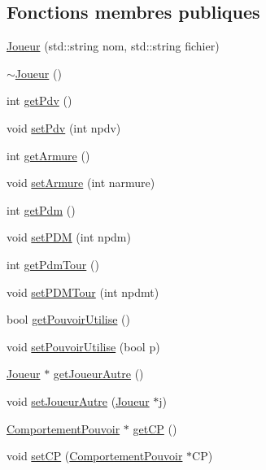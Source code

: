 \subsection*{Fonctions membres publiques}
\begin{DoxyCompactItemize}
\item 
\hyperlink{class_joueur_a055a0bc38f47a424243d44e7078af129}{Joueur} (std\-::string nom, std\-::string fichier)
\item 
\hyperlink{class_joueur_a9fb594f755601ee77ce5884c4c0861f3}{$\sim$\-Joueur} ()
\item 
int \hyperlink{class_joueur_a3deefa81ebbb921d6cef52322777dee7}{get\-Pdv} ()
\item 
void \hyperlink{class_joueur_a8f850d90156ccfb2f7599cc6658dc384}{set\-Pdv} (int npdv)
\item 
int \hyperlink{class_joueur_adab9394b18e1e65a77aa8dad7b51ec28}{get\-Armure} ()
\item 
void \hyperlink{class_joueur_a478be77fdcec7845f75fcb390b764027}{set\-Armure} (int narmure)
\item 
int \hyperlink{class_joueur_ac950c36b21e1dfc7038d9bb4e1f53361}{get\-Pdm} ()
\item 
void \hyperlink{class_joueur_a199d04e5240f4078ba2f3da2431f0bb2}{set\-P\-D\-M} (int npdm)
\item 
int \hyperlink{class_joueur_ab9297495de7521ac2198c7ce8d38191c}{get\-Pdm\-Tour} ()
\item 
void \hyperlink{class_joueur_a3984848768db7e175aeeb51ca89e4eb3}{set\-P\-D\-M\-Tour} (int npdmt)
\item 
bool \hyperlink{class_joueur_a0344bd2b30346f73e23239b62647e26d}{get\-Pouvoir\-Utilise} ()
\item 
void \hyperlink{class_joueur_a57f6f8d3ff6ba9b5026a51b23e03cd0a}{set\-Pouvoir\-Utilise} (bool p)
\item 
\hyperlink{class_joueur}{Joueur} $\ast$ \hyperlink{class_joueur_a0a2f88581ef12441b03a1cc4ed721b40}{get\-Joueur\-Autre} ()
\item 
void \hyperlink{class_joueur_a81aa9fca9a001be893bfaa607681b086}{set\-Joueur\-Autre} (\hyperlink{class_joueur}{Joueur} $\ast$j)
\item 
\hyperlink{class_comportement_pouvoir}{Comportement\-Pouvoir} $\ast$ \hyperlink{class_joueur_a85df9863c4257fe7405a6b1fe7c1e1ef}{get\-C\-P} ()
\item 
void \hyperlink{class_joueur_a7b408ea957e1b125a509ec8e88b2c148}{set\-C\-P} (\hyperlink{class_comportement_pouvoir}{Comportement\-Pouvoir} $\ast$C\-P)

\end{DoxyCompactItemize}
